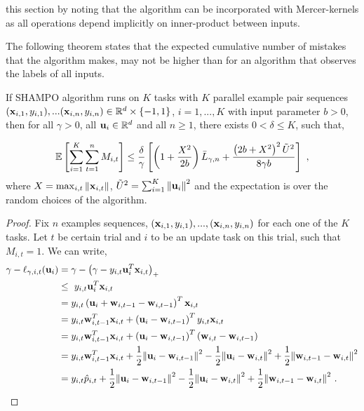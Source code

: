 { this section  by noting that the algorithm can be incorporated with
Mercer-kernels as all operations depend implicitly on inner-product
between inputs.

The following theorem states that the expected cumulative number of mistakes
that the algorithm makes, may not be higher than for an algorithm that
observes the labels of all inputs. 
\begin{theorem}
  If SHAMPO algorithm runs on $K$ tasks with $K$ parallel example pair
  sequences
  $(\mathbf{x}_{i,1},y_{i,1}),...(\mathbf{x}_{i,n},y_{i,n})\in\mathbb{R}^d\times\{-1,1\}$,
  $i=1,...,K$ with input parameter $b>0$, then for all $\gamma>0$, all
  $\mathbf{u}_{i}\in\mathbb{R}^d$ and all $n\ge1$, there exists $0<\delta\le K$, such that,
  
\begin{displaymath}
\mathbb{E}\left[ \sum_{i=1}^{K}\sum_{t=1}^{n}{M_{i,t}} \right]
\le \frac{\delta}{\gamma}\left[{\left(1+\frac{X^2}{2b} \right){\bar L}_{\gamma,n}
+\frac{\left({2b+X^2}\right)^2\tilde{U}^2}{8{\gamma}b}}\right]~,
\label{bound_FO_SHAMPO}
\end{displaymath}
 where $X=\max_{i,t}\Vert\mathbf{x}_{i,t}\Vert$,
$\tilde{U}^2=\sum_{i=1}^{K}\left\Vert {\mathbf{u}_{i}} \right\Vert^2$ and the expectation is over the
random choices of the algorithm.
\end{theorem} \label{thm:FO_bound}


\begin{proof}
Fix $n$ examples sequences, $(\mathbf{x}_{i,1},y_{i,1}),...,(\mathbf{x}_{i,n},y_{i,n})$ for each one of the $K$ tasks. 
Let $t$ be certain trial and $i$ to be an update task on this trial, such that $M_{i,t}=1$. 
We can write,
\begin{align*}
\gamma-\ell_{\gamma,i,t}(\mathbf{u}_i)&=\gamma-\left({\gamma-y_{i,t}\mathbf{u}_i^T\mathbf{x}_{i,t}}\right)_+\\
 ~&\le~  y_{i,t}\mathbf{u}_i^T\mathbf{x}_{i,t} \\
&= y_{i,t}\left({\mathbf{u}_i+\mathbf{w}_{i,t-1}-\mathbf{w}_{i,t-1}}\right)^T\mathbf{x}_{i,t}\\
&= y_{i,t}\mathbf{w}_{i,t-1}^T\mathbf{x}_{i,t}+\left({\mathbf{u}_i-\mathbf{w}_{i,t-1}}\right)^Ty_{i,t}\mathbf{x}_{i,t}\\
&= y_{i,t}\mathbf{w}_{i,t-1}^T\mathbf{x}_{i,t}+\left({\mathbf{u}_i-\mathbf{w}_{i,t-1}}\right)^T\left({\mathbf{w}_{i,t}-\mathbf{w}_{i,t-1}}\right)\\
&=  y_{i,t}\mathbf{w}_{i,t-1}^T\mathbf{x}_{i,t}+\frac{1}{2}{\left\Vert {\mathbf{u}_{i}-\mathbf{w}_{i,t-1}} \right\Vert^2}
        -\frac{1}{2}{\left\Vert {\mathbf{u}_i-\mathbf{w}_{i,t}} \right\Vert^2}+\frac{1}{2}{\left\Vert {\mathbf{w}_{i,t-1}-\mathbf{w}_{i,t}} \right\Vert^2}\\
&=  y_{i,t}\hat{p}_{i,t}+\frac{1}{2}{\left\Vert {\mathbf{u}_{i}-\mathbf{w}_{i,t-1}} \right\Vert^2}
        -\frac{1}{2}{\left\Vert {\mathbf{u}_i-\mathbf{w}_{i,t}} \right\Vert^2}+\frac{1}{2}{\left\Vert {\mathbf{w}_{i,t-1}-\mathbf{w}_{i,t}} \right\Vert^2}~.
\end{align*}


\end{proof}}
